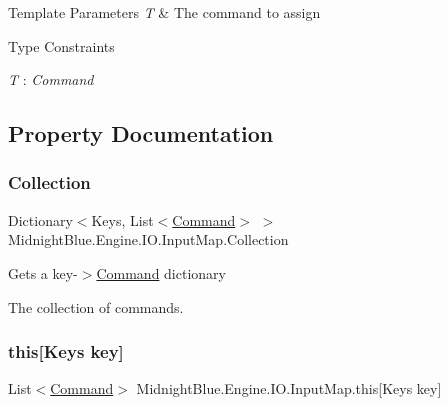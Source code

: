 \begin{DoxyTemplParams}{Template Parameters}
{\em T} & The command to assign\\
\hline
\end{DoxyTemplParams}
\begin{Desc}
\item[Type Constraints]\begin{description}
\item[{\em T} : {\em Command}]\end{description}
\end{Desc}


\subsection{Property Documentation}
\hypertarget{class_midnight_blue_1_1_engine_1_1_i_o_1_1_input_map_a0f67e318606931a3c38042f2bd29ab97}{}\label{class_midnight_blue_1_1_engine_1_1_i_o_1_1_input_map_a0f67e318606931a3c38042f2bd29ab97} 
\subsubsection{\texorpdfstring{Collection}{Collection}}
{\footnotesize\ttfamily Dictionary$<$Keys, List$<$\hyperlink{class_midnight_blue_1_1_engine_1_1_i_o_1_1_command}{Command}$>$ $>$ Midnight\+Blue.\+Engine.\+I\+O.\+Input\+Map.\+Collection\hspace{0.3cm}{\ttfamily [get]}}



Gets a key-\/$>$\hyperlink{class_midnight_blue_1_1_engine_1_1_i_o_1_1_command}{Command} dictionary 

The collection of commands.\hypertarget{class_midnight_blue_1_1_engine_1_1_i_o_1_1_input_map_a7262adae27e262343d8616a225ef94ff}{}\label{class_midnight_blue_1_1_engine_1_1_i_o_1_1_input_map_a7262adae27e262343d8616a225ef94ff} 
\subsubsection{\texorpdfstring{this[Keys key]}{this[Keys key]}}
{\footnotesize\ttfamily List$<$\hyperlink{class_midnight_blue_1_1_engine_1_1_i_o_1_1_command}{Command}$>$ Midnight\+Blue.\+Engine.\+I\+O.\+Input\+Map.\+this\mbox{[}Keys key\mbox{]}\hspace{0.3cm}{\ttfamily [get]}}



